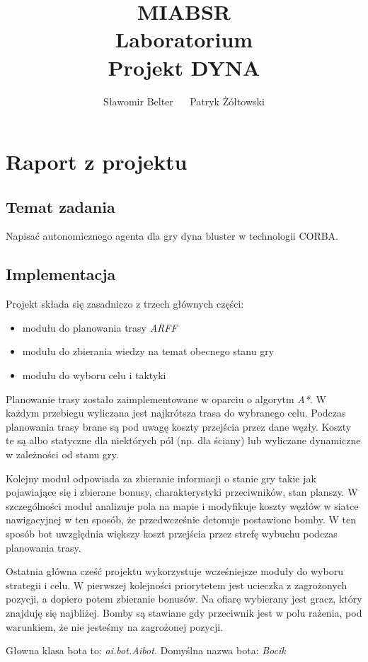 \documentclass[a4paper,11pt]{article}
\author{Sławomir Belter $\quad$ Patryk Żółtowski}
\title{MIABSR  \\ Laboratorium \\ Projekt DYNA}
\begin{document}
\maketitle

\section{Raport z projektu}

\subsection{Temat zadania }

Napisać autonomicznego agenta dla gry dyna bluster w technologii CORBA.

\subsection{Implementacja}

Projekt składa się zasadniczo z trzech głównych części:
\begin{itemize}
\item modułu do planowania trasy \emph{ARFF}
\item modułu do zbierania wiedzy na temat obecnego stanu gry
\item modułu do wyboru celu i taktyki
\end{itemize}

Planowanie trasy zostało zaimplementowane w oparciu o algorytm \emph{A*}. W
każdym przebiegu wyliczana jest najkrótsza trasa do wybranego celu. Podczas
planowania trasy brane są pod uwagę koszty przejścia przez dane węzły. Koszty te
są albo statyczne dla niektórych pól (np. dla ściany) lub wyliczane dynamiczne
w zależności od stanu gry.

Kolejny moduł odpowiada za zbieranie informacji o stanie gry takie jak
pojawiające się i zbierane bonusy, charakterystyki przeciwników, stan planszy.
W szczególności moduł analizuje pola na mapie i modyfikuje koszty węzłów w
siatce nawigacyjnej w ten sposób, że przedwcześnie detonuje postawione bomby. W
ten sposób bot uwzględnia większy koszt przejścia przez strefę wybuchu podczas
planowania trasy.

Ostatnia główna cześć projektu wykorzystuje wcześniejsze moduły do wyboru
strategii i celu. W pierwszej kolejności priorytetem jest ucieczka z
zagrożonych pozycji, a dopiero potem zbieranie bonusów. Na ofiarę wybierany jest
gracz, który znajduję się najbliżej. Bomby są stawiane gdy przeciwnik jest w
polu rażenia, pod warunkiem, że nie jesteśmy na zagrożonej pozycji.

Głowna klasa bota to: \emph{ai.bot.Aibot}. Domyślna nazwa bota: \emph{Bocik}
\end{document}
